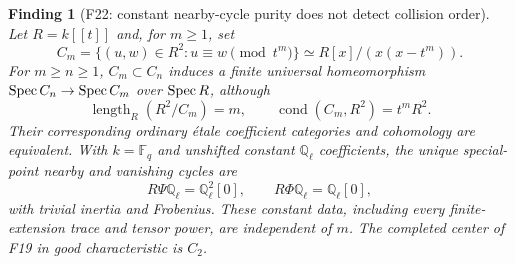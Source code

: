 \documentclass[11pt,a4paper]{article}
\newcommand{\Q}{\mathbb Q}\newcommand{\Z}{\mathbb Z}\newcommand{\C}{\mathbb C}\newcommand{\N}{\mathbb N}\newcommand{\F}{\mathbb F}
\newcommand{\fid}[1]{\textsf{#1}}\newcommand{\gate}[1]{\textsf{#1}}
\theoremstyle{named}\newtheorem{finding}{Finding}[section]
\theoremstyle{definition}\newtheorem{definition}[finding]{Definition}
\theoremstyle{remark}\newtheorem{remark}[finding]{Remark}
\begin{document}
\begin{finding}[\fid{F22}: constant nearby-cycle purity does not detect collision order]\label{f:collision}
Let $R=k[[t]]$ and, for $m\ge1$, set
\[
 C_m=\{(u,w)\in R^2:u\equiv w\pmod{t^m}\}
     \simeq R[x]/(x(x-t^m)).
\]
For $m\ge n\ge1$, $C_m\subset C_n$ induces a finite universal
homeomorphism $\operatorname{Spec} C_n\to\operatorname{Spec} C_m$ over $\operatorname{Spec} R$, although
\[
 \operatorname{length}_R(R^2/C_m)=m,\qquad
 \operatorname{cond}(C_m,R^2)=t^mR^2.
\]
Their corresponding ordinary \'etale coefficient categories and
cohomology are equivalent. With $k=\F_q$ and unshifted constant
$\Q_\ell$ coefficients, the unique special-point nearby and vanishing
cycles are
\[
 R\Psi\Q_\ell=\Q_\ell^2[0],\qquad
 R\Phi\Q_\ell=\Q_\ell[0],
\]
with trivial inertia and Frobenius. These constant data, including every
finite-extension trace and tensor power, are independent of $m$.
The completed center of \fid{F19} in good characteristic is $C_2$.
\end{finding}
\end{document}
